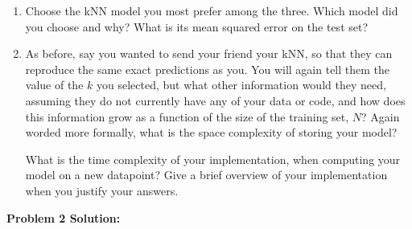 \documentclass[submit]{harvardml}
\begin{document}
\begin{problem}
\begin{enumerate}
\item Choose the kNN model you most prefer among the three. Which model did you choose and why? What is its mean squared error on the test set?

\item As before, say you wanted to send your friend your kNN, so that they can reproduce the same exact predictions as you. You will again tell them the value of the $k$ you selected, but what other information would they need, assuming they do not currently have any of your data or code, and how does this information grow as a function of the size of the training set, $N$? Again worded more formally, what is the space complexity of storing your model?

What is the time complexity of your implementation, when computing your model on a new datapoint? Give a brief overview of your implementation when you justify your answers. 
\end{enumerate}

\end{problem}
\newpage
\textbf{Problem 2 Solution:}\\
\end{document}
